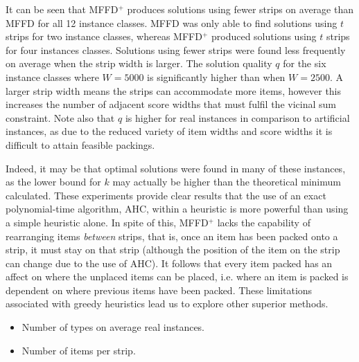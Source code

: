 \documentclass{elsarticle}
\begin{document}
It can be seen that MFFD$^+$ produces solutions using fewer strips on average than MFFD for all 12 instance classes. MFFD was only able to find solutions using $t$ strips for two instance classes, whereas MFFD$^+$ produced solutions using $t$ strips for four instances classes. Solutions using fewer strips were found less frequently on average when the strip width is larger. The solution quality $q$ for the six instance classes where $W = 5000$ is significantly higher than when $W = 2500$. A larger strip width means the strips can accommodate more items, however this increases the number of adjacent score widths that must fulfil the vicinal sum constraint. Note also that $q$ is higher for real instances in comparison to artificial instances, as due to the reduced variety of item widths and score widths it is difficult to attain feasible packings. 

Indeed, it may be that optimal solutions were found in many of these instances, as the lower bound for $k$ may actually be higher than the theoretical minimum calculated. These experiments provide clear results that the use of an exact polynomial-time algorithm, AHC, within a heuristic is more powerful than using a simple heuristic alone. In spite of this, MFFD$^+$ lacks the capability of rearranging items \emph{between} strips, that is, once an item has been packed onto a strip, it must stay on that strip (although the position of the item on the strip can change due to the use of AHC). It follows that every item packed has an affect on where the unplaced items can be placed, i.e. where an item is packed is dependent on where previous items have been packed. These limitations associated with greedy heuristics lead us to explore other superior methods.

{\color{myPink}
\begin{itemize}[leftmargin=*]
	\item Number of types on average real instances.
	\item Number of items per strip.
\end{itemize}
}

\end{document}
